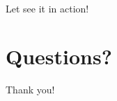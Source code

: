 \documentclass[14pt,notes,svgnames,aspectratio=169]{beamer}
\begin{document}
\begin{frame}
    \centerline{\Large Let see it in action!}
\end{frame}

\begingroup
    \section{Questions?}
\endgroup

\begin{frame}
    \centerline{\Large Thank you!}
\end{frame}
\end{document}
